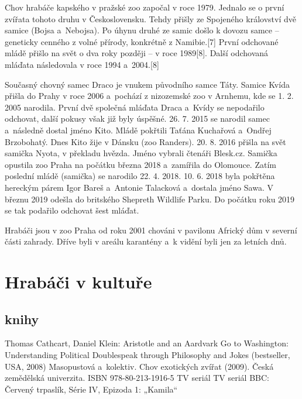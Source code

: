 \documentclass[a4paper, 12pt]{article}
\begin{document}
Chov hrabáče kapského v pražské zoo započal v roce 1979. Jednalo se o první zvířata tohoto druhu v Československu. Tehdy přišly ze Spojeného království dvě samice (Bojsa a~Nebojsa). Po úhynu druhé ze samic došlo k dovozu samce – geneticky cenného z volné přírody, konkrétně z Namibie.[7] První odchované mládě přišlo na svět o dva roky později – v roce 1989[8]. Další odchovaná mláďata následovala v roce 1994 a~2004.[8]

Současný chovný samec Draco je vnukem původního samce Táty.
Samice Kvída přišla do Prahy v roce 2006 a~pochází z nizozemské zoo v Arnhemu, kde se 1. 2. 2005 narodila.
První dvě společná mláďata Draca a~Kvídy se nepodařilo odchovat, další pokusy však již byly úspěšné. 26. 7. 2015 se narodil samec a~následně dostal jméno Kito.
Mládě pokřtili Taťána Kuchařová a~Ondřej Brzobohatý. Dnes Kito žije v Dánsku (zoo Randers). 20. 8. 2016 přišla na svět samička Nyota, v překladu hvězda.
Jméno vybrali čtenáři Blesk.cz. Samička opustila zoo Praha na počátku března 2018 a~zamířila do Olomouce. Zatím poslední mládě (samička) se narodilo 22. 4. 2018.
10. 6. 2018 byla pokřtěna hereckým párem Igor Bareš a~Antonie Talacková a~dostala jméno Sawa. V březnu 2019 odešla do britského Shepreth Wildlife Parku. Do počátku roku 2019 se tak podařilo odchovat šest mláďat.

Hrabáči jsou v zoo Praha od roku 2001 chováni v pavilonu Africký dům v severní části zahrady. Dříve byli v areálu karantény a~k vidění byli jen za letních dnů.

\section{Hrabáči v kultuře}

\subsection{knihy}

Thomas Cathcart, Daniel Klein: Aristotle and an Aardvark Go to Washington: Understanding Political Doublespeak through Philosophy and Jokes (bestseller, USA, 2008)
Masopustová a~kolektiv. Chov exotických zvířat (2009). Česká zemědělská univerzita. ISBN 978-80-213-1916-5
TV seriál
TV seriál BBC: Červený trpaslík, Série IV, Epizoda 1: „Kamila“
\end{document}
